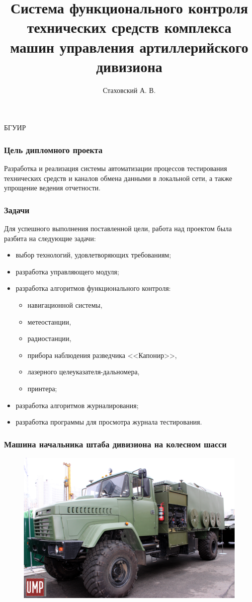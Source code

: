 \documentclass[luatex,mathserif,serif]{beamer}
\begin{document}
\title[Система ФКУ КМУ артиллерийского дивизиона] %
{Система функционального контроля технических средств комплекса машин управления артиллерийского дивизиона}
\author %
{Стаховский А. В.}
\institute
{
	\inst{}
  БГУИР
}

\frame{\titlepage}

\begin{frame}
	\frametitle{Цель дипломного проекта}
	Разработка и реализация системы автоматизации процессов тестирования
	технических средств и каналов обмена данными в локальной сети, а также  упрощение ведения отчетности.
\end{frame}

\begin{frame}
	\frametitle{Задачи}
	Для успешного выполнения поставленной цели, работа над проектом была разбита на следующие задачи:
	\begin{itemize}
		\item выбор технологий, удовлетворяющих требованиям;
		\item разработка управляющего модуля;
		\item разработка алгоритмов функционального контроля:
			\begin{itemize}
				\item навигационной системы,
				\item метеостанции,
				\item радиостанции,
				\item прибора наблюдения разведчика <<Капонир>>,
				\item лазерного целеуказателя-дальномера,
				\item принтера;
			\end{itemize}
		\item разработка алгоритмов журналирования;
		\item разработка программы для просмотра журнала тестирования.
	\end{itemize}
\end{frame}

\begin{frame}
	\frametitle{Машина начальника штаба дивизиона на колесном шасси}
	\begin{figure}
		\centering
		\includegraphics[scale=0.25]{div_com}
	\end{figure}
\end{frame}
\end{document}
